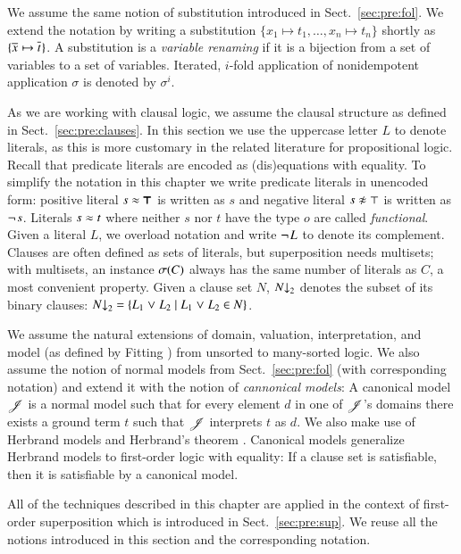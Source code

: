 We assume the same notion of substitution introduced in Sect.~\ref{sec:pre:fol}.
We extend the notation by writing a substitution $\{x_1 \mapsto t_1,
\ldots,\allowbreak x_n \mapsto t_n\}$ shortly as $\{ \overline{x}_{} \mapsto \overline{t}_{} \}$.
A substitution is a \emph{variable renaming} if it is a
bijection from a set of variables to a set of variables. Iterated, $i$-fold application 
of nonidempotent application $\sigma$ is denoted by $\sigma^i$.


As we are working with clausal logic, we assume the clausal structure as defined
in Sect.~\ref{sec:pre:clauses}. In this section we use the uppercase letter $L$
to denote literals, as this is more customary in the related literature for
propositional logic. Recall that predicate literals  are encoded as
(dis)equations with equality. To simplify the notation in this chapter we write
predicate literals in unencoded form: positive literal $s \approx \pmb{\top}$ is
written as $s$ and negative literal $\neqlit{s}{\top}$ is written as
$\neg{\kern.2ex s}$. Literals $s \approx t$ where neither $s$ nor $t$ have the
type $o$ are called \emph{functional}. Given a literal $L$, we overload notation
and write $\neg{\kern.2ex L}$ to denote its complement. Clauses are often defined as
sets of literals, but superposition needs multisets; with multisets, an instance
$\sigma(C)$ always has the same number of literals as $C$, a most convenient
property. Given a clause set $N$, $N{\downarrow}_2$ denotes the subset of its binary
clauses: $N{\downarrow}_2 = \{ L_1 \mathrel{\lor} L_2 \mid L_1 \mathrel{\lor} L_2 \in N \}$.

We assume the natural extensions of domain, valuation, interpretation, and model
(as defined by Fitting \cite{mf-1996-fol}) from unsorted to many-sorted logic.
We also assume the notion of normal models from Sect.~\ref{sec:pre:fol} (with
corresponding notation) and extend it with the notion of \emph{cannonical
models}: A canonical model $\mathscr{J}$ is a normal model such that for every
element $d$ in one of $\mathscr{J}$'s domains there exists a ground term $t$ such
that $\mathscr{J}$ interprets $t$ as $d$. 
We also make use of Herbrand models and Herbrand's theorem \cite[Sect.~5.4]{mf-1996-fol}.
Canonical models generalize Herbrand
models to first-order logic with equality: If a clause set is satisfiable, then
it is satisfiable by a canonical model.

All of the techniques described in this chapter are applied in the context of
first-order superposition which is introduced in Sect.~\ref{sec:pre:sup}. We
reuse all the notions introduced in this section and the corresponding notation. 

